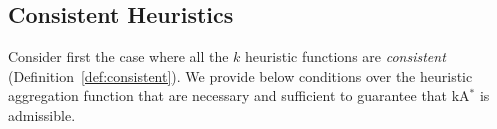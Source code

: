 \documentclass[smallextended]{svjour3}       %
\newcommand{\omspp}{\ac{OMSPP}\xspace}
\newcommand{\kastar}{kA$^*$\xspace}
\newcommand{\kastarphi}{\textup{kA}$^*_{\Phi}$\xspace}
\newcommand{\axiomcons}{consistent\xspace}
\newcommand{\axiomreexp}{re-expansion-avoiding\xspace}
\newcommand{\Axiomcons}{Consistent\xspace}
\newcommand{\Axiomreexp}{Re-expansion-avoiding\xspace}
\newcommand{\Axiomreexpnoun}{Re-expansion-avoiding\xspace}
\newcommand{\vect}[1]{\mathbf{#1}}
\begin{document}

\subsection{Consistent Heuristics}
\label{sec:consistent-heuristic}

Consider first the case where all the $k$ heuristic functions are \emph{consistent} (Definition~\ref{def:consistent}).
We provide below conditions over the heuristic aggregation function that are necessary and sufficient to guarantee that \kastar is admissible. 



\end{document}
